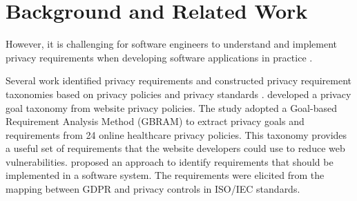 \section{Background and Related Work} \label{sec:related-work}

 However, it is challenging for software engineers to understand and implement privacy requirements when developing software applications in practice \cite{Gurses2011}. 

Several work identified privacy requirements and constructed privacy requirement taxonomies based on privacy policies and privacy standards \cite{Antn2004,Ayala-Rivera2018}. \citeauthor{Antn2004} \cite{Antn2004} developed a privacy goal taxonomy from website privacy policies. The study adopted a Goal-based Requirement Analysis Method (GBRAM) to extract privacy goals and requirements from 24 online healthcare privacy policies. This taxonomy provides a useful set of requirements that the website developers could use to reduce web vulnerabilities. \citeauthor{Ayala-Rivera2018} \cite{Ayala-Rivera2018} proposed an approach to identify requirements that should be implemented in a software system. The requirements were elicited from the mapping between GDPR and privacy controls in ISO/IEC standards. 

